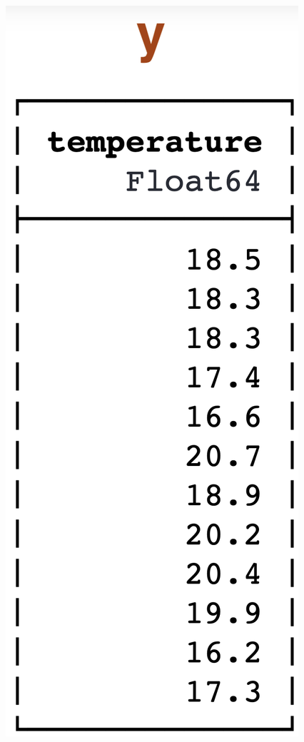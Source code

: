 \documentclass[t]{beamer}
\begin{document}
\begin{frame}
\begin{center}
    \includegraphics[scale=0.17]{y.png}
  \end{center}
\end{frame}
\end{document}
